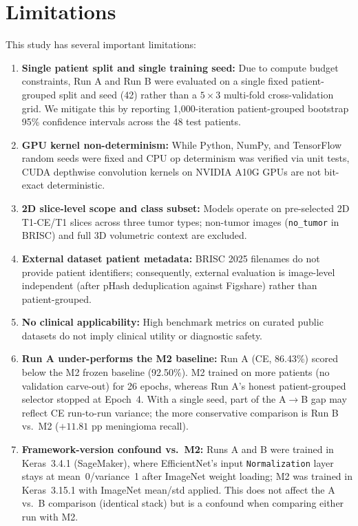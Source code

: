 \documentclass[conference]{IEEEtran}
\begin{document}
\section{Limitations}
This study has several important limitations:
\begin{enumerate}
    \item \textbf{Single patient split and single training seed:} Due to compute budget constraints, Run A and Run B were evaluated on a single fixed patient-grouped split and seed (42) rather than a $5\times3$ multi-fold cross-validation grid. We mitigate this by reporting 1,000-iteration patient-grouped bootstrap 95\% confidence intervals across the 48 test patients.
    \item \textbf{GPU kernel non-determinism:} While Python, NumPy, and TensorFlow random seeds were fixed and CPU op determinism was verified via unit tests, CUDA depthwise convolution kernels on NVIDIA A10G GPUs are not bit-exact deterministic.
    \item \textbf{2D slice-level scope and class subset:} Models operate on pre-selected 2D T1-CE/T1 slices across three tumor types; non-tumor images (\texttt{no\_tumor} in BRISC) and full 3D volumetric context are excluded.
    \item \textbf{External dataset patient metadata:} BRISC 2025 filenames do not provide patient identifiers; consequently, external evaluation is image-level independent (after pHash deduplication against Figshare) rather than patient-grouped.
    \item \textbf{No clinical applicability:} High benchmark metrics on curated public datasets do not imply clinical utility or diagnostic safety.
    \item \textbf{Run A under-performs the M2 baseline:} Run A (CE, 86.43\%) scored below the M2 frozen baseline (92.50\%). M2 trained on more patients (no validation carve-out) for 26 epochs, whereas Run A's honest patient-grouped selector stopped at Epoch~4. With a single seed, part of the A$\to$B gap may reflect CE run-to-run variance; the more conservative comparison is Run B vs.\ M2 ($+11.81$ pp meningioma recall).
    \item \textbf{Framework-version confound vs.\ M2:} Runs A and B were trained in Keras~3.4.1 (SageMaker), where EfficientNet's input \texttt{Normalization} layer stays at mean~0/variance~1 after ImageNet weight loading; M2 was trained in Keras~3.15.1 with ImageNet mean/std applied. This does not affect the A vs.\ B comparison (identical stack) but is a confound when comparing either run with M2.
\end{enumerate}
\end{document}
